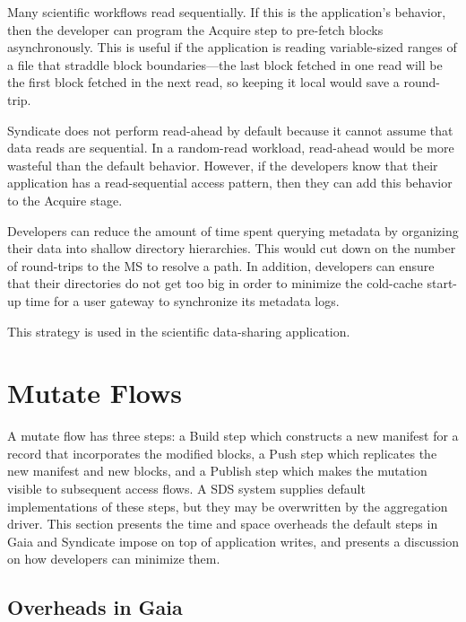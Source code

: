 \hfill \break
{}
\hfill \break

Many scientific workflows read sequentially.  If this is the application's
behavior, then the developer can program the Acquire step to pre-fetch blocks
asynchronously.  This is useful if the application is reading
variable-sized ranges of a file that straddle block boundaries---the last block
fetched in one read will be the first block fetched in the next read, so keeping
it local would save a round-trip.

Syndicate does not perform read-ahead by
default because it cannot assume that data reads are sequential.  In a
random-read workload, read-ahead would be more wasteful than the default
behavior.  However, if  the developers know that their application has a
read-sequential access pattern, then they can add this behavior to the Acquire
stage.

\hfill \break
{}
\hfill \break

Developers can reduce the amount of time spent querying metadata by organizing
their data into shallow directory hierarchies.  This would cut down on the
number of round-trips to the MS to resolve a path.  In addition, developers can
ensure that their directories do not get too big in order to minimize the
cold-cache start-up time for a user gateway to synchronize its metadata logs.

This strategy is used in the scientific data-sharing application.

\section{Mutate Flows}

A mutate flow has three steps:  a Build step which constructs a new manifest
for a record that incorporates the modified blocks, a Push step which replicates
the new manifest and new blocks, and a Publish step which makes the mutation
visible to subsequent access flows.  A SDS system supplies default
implementations of these steps, but they may be overwritten by the aggregation
driver.  This section presents the time and space overheads the default steps in
Gaia and Syndicate impose on top of application writes, and presents a
discussion on how developers can minimize them.

\subsection{Overheads in Gaia}

